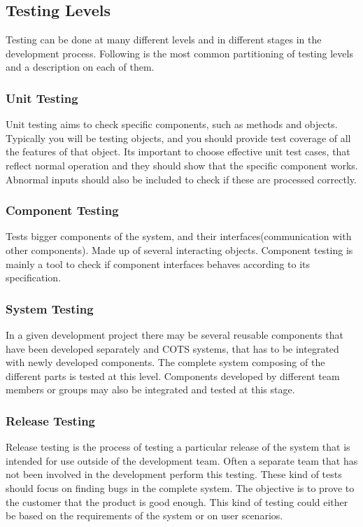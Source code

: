 \subsection{Testing Levels}
Testing can be done at many different levels and in different stages in the development process. Following is the most common partitioning of testing levels and a description on each of them.

\subsubsection{Unit Testing}
Unit testing aims to check specific components, such as methods and objects. Typically you will be testing objects, and you should provide test coverage of all the features of that object. Its important to choose effective unit test cases, that reflect normal operation and they should show that the specific component works. Abnormal inputs should also be included to check if these are processed correctly.

\subsubsection{Component Testing}
Tests bigger components of the system, and their interfaces(communication with other components). Made up of several interacting objects. Component testing is mainly a tool to check if component interfaces behaves according to its specification.

\subsubsection{System Testing}
In a given development project there may be several reusable components that have been developed separately and COTS systems, that has to be integrated with newly developed components. The complete system composing of the different parts is tested at this level. Components developed by different team members or groups may also be integrated and tested at this stage.

\subsubsection{Release Testing}
Release testing is the process of testing a particular release of the system that is intended for use outside of the development team. Often a separate team that has not been involved in the development perform this testing. These kind of tests should focus on finding bugs in the complete system. The objective is to prove to the customer that the product is good enough. This kind of testing could either be based on the requirements of the system or on user scenarios.


